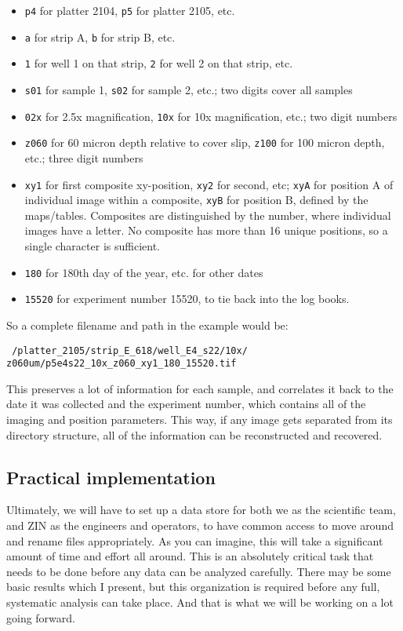 \begin{itemize}
\item {\tt p4} for platter 2104, {\tt p5} for platter 2105, etc.
\item {\tt a} for strip A, {\tt b} for strip B, etc.
\item {\tt 1} for well 1 on that strip, {\tt 2} for well 2 on that strip, etc.
\item {\tt s01} for sample 1, {\tt s02} for sample 2, etc.; two digits cover all samples
\item {\tt 02x} for 2.5x magnification, {\tt 10x} for 10x magnification, etc.; two digit numbers
\item {\tt z060} for 60 micron depth relative to cover slip, {\tt z100} for 100 micron depth, etc.; three digit numbers
\item {\tt xy1} for first composite xy-position, {\tt xy2} for second, etc; {\tt xyA} for position A of individual image within a composite, {\tt xyB} for position B, defined by the maps/tables. Composites are distinguished by the number, where individual images have a letter. No composite has more than 16 unique positions, so a single character is sufficient.
\item {\tt 180} for 180th day of the year, etc. for other dates
\item {\tt 15520} for experiment number 15520, to tie back into the log books.
\end{itemize}

So a complete filename and path in the example would be:

{\tt 
/platter\_2105/strip\_E\_618/well\_E4\_s22/10x/
z060um/p5e4s22\_10x\_z060\_xy1\_180\_15520.tif
}

This preserves a lot of information for each sample, and correlates it back to
the date it was collected and the experiment number, which contains all of the
imaging and position parameters. This way, if any image gets separated from its
directory structure, all of the information can be reconstructed and recovered.

\subsection{Practical
implementation}\hypertarget{practical-implementation}{}\label{practical-implementation} Ultimately, we will have to set up a data store for both we as the scientific
team, and ZIN as the engineers and operators, to have common access to move
around and rename files appropriately. As you can imagine, this will take a
significant amount of time and effort all around. This is an absolutely critical
task that needs to be done before any data can be analyzed carefully. There may
be some basic results which I present, but this organization is required before
any full, systematic analysis can take place. And that is what we will be
working on a lot going forward.


